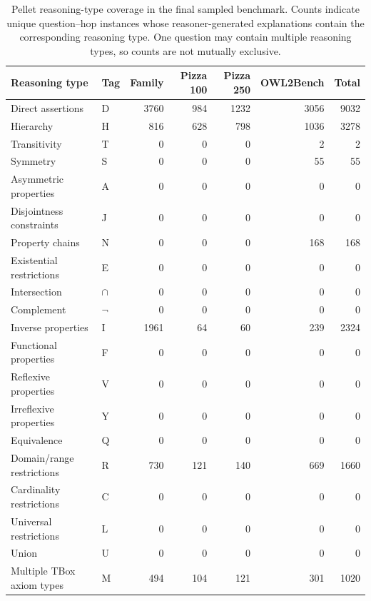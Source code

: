 \begin{table}[t]
\centering
\caption{Pellet reasoning-type coverage in the final sampled benchmark. Counts indicate unique question--hop instances whose reasoner-generated explanations contain the corresponding reasoning type. One question may contain multiple reasoning types, so counts are not mutually exclusive.}
\label{tab:reasoning-type-coverage}
\begin{tabular}{llrrrrr}
\toprule
Reasoning type & Tag & Family & Pizza 100 & Pizza 250 & OWL2Bench & Total \\
\midrule
Direct assertions & D & 3760 & 984 & 1232 & 3056 & 9032 \\
Hierarchy & H & 816 & 628 & 798 & 1036 & 3278 \\
Transitivity & T & 0 & 0 & 0 & 2 & 2 \\
Symmetry & S & 0 & 0 & 0 & 55 & 55 \\
Asymmetric properties & A & 0 & 0 & 0 & 0 & 0 \\
Disjointness constraints & J & 0 & 0 & 0 & 0 & 0 \\
Property chains & N & 0 & 0 & 0 & 168 & 168 \\
Existential restrictions & E & 0 & 0 & 0 & 0 & 0 \\
Intersection & $\cap$ & 0 & 0 & 0 & 0 & 0 \\
Complement & $\neg$ & 0 & 0 & 0 & 0 & 0 \\
Inverse properties & I & 1961 & 64 & 60 & 239 & 2324 \\
Functional properties & F & 0 & 0 & 0 & 0 & 0 \\
Reflexive properties & V & 0 & 0 & 0 & 0 & 0 \\
Irreflexive properties & Y & 0 & 0 & 0 & 0 & 0 \\
Equivalence & Q & 0 & 0 & 0 & 0 & 0 \\
Domain/range restrictions & R & 730 & 121 & 140 & 669 & 1660 \\
Cardinality restrictions & C & 0 & 0 & 0 & 0 & 0 \\
Universal restrictions & L & 0 & 0 & 0 & 0 & 0 \\
Union & U & 0 & 0 & 0 & 0 & 0 \\
Multiple TBox axiom types & M & 494 & 104 & 121 & 301 & 1020 \\
\bottomrule
\end{tabular}
\end{table}
